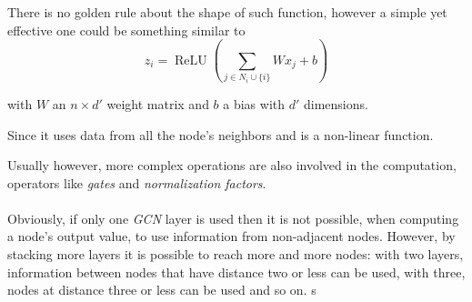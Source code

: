 \documentclass[a4paper,10pt,twocolumn]{article}
\newcommand{\GCN}{\emph{GCN}}
\begin{document}
There is no golden rule about the shape of such function, however a simple yet effective one could be something similar to
$$
z_i = \mathop{\mathrm{ReLU}}\left(\sum_{j \in N_i	\cup \{i\}} Wx_j + b\right)
$$
\begin{center}
\footnotesize
with $W$ an $n\times d'$  weight matrix and $b$ a bias with  $d'$ dimensions.
\end{center}
Since it uses data from all the node's neighbors and is a non-linear function.

Usually however, more complex operations are also involved in the computation, operators like \emph{gates} and \emph{normalization factors}.

\paragraph{}
Obviously, if only one \GCN{} layer is used then it is not possible, when computing a node's output value, to use information from non-adjacent nodes.
However, by stacking more layers it is possible to reach more and more nodes: with two layers, information between nodes that have distance  two or less can be used, with three, nodes at distance three or less can be used and so on. s
\end{document}
